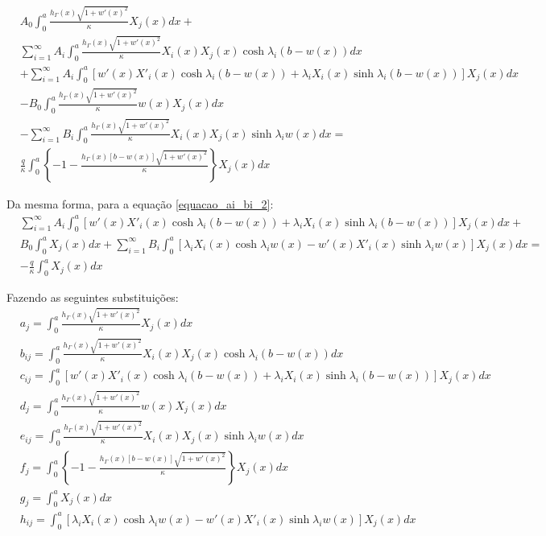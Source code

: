\begin{align}	
	& A_0 \int_0^a\frac{h_\Gamma(x)\sqrt{1 + w'(x)^2}}{\kappa}X_j(x)dx + \nonumber \\
	& \sum_{i=1}^\infty A_i \int_0^a\frac{h_\Gamma(x)\sqrt{1 + w'(x)^2}}{\kappa} X_i(x)X_j(x) \cosh\lambda_i (b - w(x))dx  \nonumber \\
	& + \sum_{i=1}^\infty A_i \int_0^a[w'(x)X'_i(x) \cosh\lambda_i (b - w(x)) + \lambda_i X_i(x) \sinh\lambda_i (b - w(x))]X_j(x)dx \nonumber \\		
		&
		- B_0 \int_0^a\frac{h_\Gamma(x)\sqrt{1 + w'(x)^2}}{\kappa} w(x)X_j(x)dx \nonumber \\
		& - \sum_{i=1}^\infty B_i \int_0^a\frac{h_\Gamma(x)\sqrt{1 + w'(x)^2}}{\kappa} X_i(x)X_j(x)\sinh\lambda_i w(x)dx = \nonumber \\
		& \frac{q}{\kappa} \int_0^a \left\lbrace - 1 - \frac{h_\Gamma(x)[b - w(x)]\sqrt{1 + w'(x)^2}}{\kappa}\right\rbrace X_j(x)dx
\end{align}

Da mesma forma, para a equação \eqref{equacao_ai_bi_2}:
\begin{align}
	&
	\sum_{i=1}^\infty A_i \int_0^a[w'(x) X'_i(x) \cosh\lambda_i (b - w(x))
		+ \lambda_i X_i(x) \sinh\lambda_i (b - w(x))]X_j(x)dx + \nonumber \\
	&
	B_0\int_0^a X_j(x)dx + \sum_{i=1}^\infty B_i \int_0^a[\lambda_i X_i(x)\cosh\lambda_i w(x)
	-
	w'(x) X'_i(x)\sinh\lambda_i w(x)]X_j(x)dx = \nonumber \\
	&-\frac{q}{\kappa}\int_0^a X_j(x)dx
\end{align}

Fazendo as seguintes substituições:
\begin{align}
	& a_j = \int_0^a\frac{h_\Gamma(x)\sqrt{1 + w'(x)^2}}{\kappa}X_j(x)dx \\
	& b_{ij} = \int_0^a\frac{h_\Gamma(x)\sqrt{1 + w'(x)^2}}{\kappa} X_i(x)X_j(x) \cosh\lambda_i (b - w(x))dx \\
	& c_{ij} = \int_0^a[w'(x)X'_i(x) \cosh\lambda_i (b - w(x)) + \lambda_i X_i(x) \sinh\lambda_i (b - w(x))]X_j(x)dx \\
	& d_j = \int_0^a\frac{h_\Gamma(x)\sqrt{1 + w'(x)^2}}{\kappa} w(x)X_j(x)dx \\
	& e_{ij} = \int_0^a\frac{h_\Gamma(x)\sqrt{1 + w'(x)^2}}{\kappa} X_i(x)X_j(x)\sinh\lambda_i w(x)dx \\
	& f_j =  \int_0^a \left\lbrace -1 - \frac{h_\Gamma(x)[b - w(x)]\sqrt{1 + w'(x)^2}}{\kappa}\right\rbrace X_j(x)dx \\
	& g_j = \int_0^a X_j(x)dx \\
	& h_{ij} = \int_0^a[\lambda_i X_i(x)\cosh\lambda_i w(x) - w'(x) X'_i(x)\sinh\lambda_i w(x)]X_j(x)dx
\end{align}

